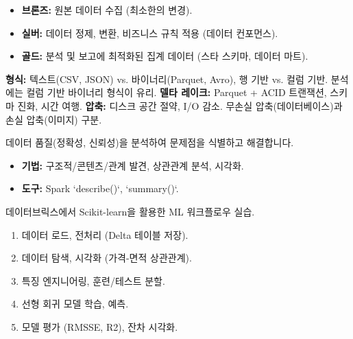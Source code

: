 \documentclass[11pt,a4paper]{article}
\begin{document}
\begin{tcolorbox}[mybox, title=데이터 아키텍처 레이어]
\begin{itemize}
    \item \textbf{브론즈:} 원본 데이터 수집 (최소한의 변경).
    \item \textbf{실버:} 데이터 정제, 변환, 비즈니스 규칙 적용 (데이터 컨포먼스).
    \item \textbf{골드:} 분석 및 보고에 최적화된 집계 데이터 (스타 스키마, 데이터 마트).
\end{itemize}
\end{tcolorbox}

\begin{tcolorbox}[mybox, title=데이터 형식 및 압축]
\textbf{형식:} 텍스트(CSV, JSON) vs. 바이너리(Parquet, Avro), 행 기반 vs. 컬럼 기반. 분석에는 컬럼 기반 바이너리 형식이 유리.
\textbf{델타 레이크:} Parquet + ACID 트랜잭션, 스키마 진화, 시간 여행.
\textbf{압축:} 디스크 공간 절약, I/O 감소. 무손실 압축(데이터베이스)과 손실 압축(이미지) 구분.
\end{tcolorbox}

\begin{tcolorbox}[mybox, title=데이터 프로파일링]
데이터 품질(정확성, 신뢰성)을 분석하여 문제점을 식별하고 해결합니다.
\begin{itemize}
    \item \textbf{기법:} 구조적/콘텐츠/관계 발견, 상관관계 분석, 시각화.
    \item \textbf{도구:} Spark `describe()`, `summary()`.
\end{itemize}
\end{tcolorbox}

\begin{tcolorbox}[mybox, title=Lab 01: 주택 가격 예측]
데이터브릭스에서 Scikit-learn을 활용한 ML 워크플로우 실습.
\begin{enumerate}
    \item 데이터 로드, 전처리 (Delta 테이블 저장).
    \item 데이터 탐색, 시각화 (가격-면적 상관관계).
    \item 특징 엔지니어링, 훈련/테스트 분할.
    \item 선형 회귀 모델 학습, 예측.
    \item 모델 평가 (RMSSE, R2), 잔차 시각화.
\end{enumerate}
\end{tcolorbox}
\end{document}
